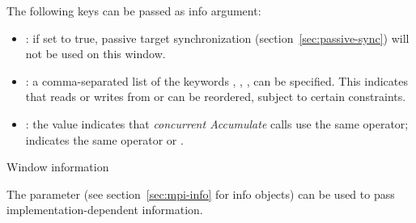The following keys can be passed as info argument:
\begin{itemize}
\item {}: if set to true, passive target synchronization
  (section~\ref{sec:passive-sync}) will not be used on this window.
\item {}: a comma-separated list of
  the keywords , ,
  ,  can be specified. This
  indicates that reads or writes from  or
   can be reordered, subject to
  certain constraints.
\item {}: the value 
  indicates that
  \emph{concurrent Accumulate}
   calls use the same operator;
   indicates the same operator or
  .
\end{itemize}

 {Window information}
\label{sec:win-attr}

The  parameter
(see section~\ref{sec:mpi-info} for info objects)
can be used to pass implementation-dependent 
information.

